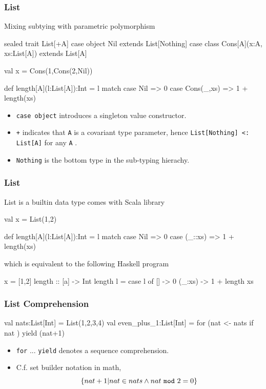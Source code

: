 \documentclass{beamer}
\newcommand{\beb}{\begin{exampleblock}}
\newcommand{\eeb}{\end{exampleblock}}
\begin{document}
\begin{frame}[fragile]
\frametitle{List}

\beb{Mixing subtying with parametric polymorphism}
\begin{code}
sealed trait List[+A]
case object Nil extends List[Nothing]
case class Cons[A](x:A, xs:List[A]) extends List[A]

val x = Cons(1,Cons(2,Nil))

def length[A](l:List[A]):Int = l match {
   case Nil => 0
   case Cons(_,xs) => 1 + length(xs)
}
\end{code}
\eeb
\begin{itemize}
 \item {\tt case object} introduces a singleton value constructor.
 \item {\tt +} indicates that {\tt A} is a covariant type parameter,
   hence {\tt List[Nothing] <: List[A]} for any {\tt A} .
 \item {\tt Nothing} is the bottom type in the sub-typing hierachy.
\end{itemize}
\end{frame}


\begin{frame}[fragile]
\frametitle{List}

List is a builtin data type comes with Scala library
\beb{}
\begin{code}
val x = List(1,2)

def length[A](l:List[A]):Int = l match {
   case Nil => 0
   case (_::xs) => 1 + length(xs)
}
\end{code}
\eeb
which is equivalent to the following Haskell program
\beb{}
\begin{code}
x = [1,2]
length :: [a] -> Int 
length l = case l of 
   [] -> 0
   (_:xs) -> 1 + length xs
\end{code}
\eeb
\end{frame}


\begin{frame}[fragile]
\frametitle{List Comprehension}
\beb{}
\begin{code}
val nats:List[Int] = List(1,2,3,4)
val even_plus_1:List[Int] = for (nat <- nats
                                 if nat %
                                ) yield (nat+1)
\end{code}
\eeb
\begin{itemize}
 \item {\tt for} ... {\tt yield} denotes a sequence comprehension. 
 \item C.f. set builder notation in math,  
$$
\{ nat + 1 | nat \in nats \wedge nat~ {\tt mod}~ 2 = 0 \}
$$
\end{itemize}
\end{frame}
\end{document}

